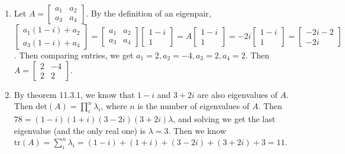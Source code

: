 \documentclass[10pt,english]{article}
\begin{document}
\begin{enumerate}
\item Let $A=\begin{bmatrix}a_1&a_2\\a_3&a_4\end{bmatrix}$. By the definition of an eigenpair, $\begin{bmatrix}a_1(1-i)+a_2\\a_3(1-i)+a_4\end{bmatrix}=\begin{bmatrix}a_1&a_2\\a_3&a_4\end{bmatrix}\begin{bmatrix}1-i\\1\end{bmatrix}=A\begin{bmatrix}1-i\\1\end{bmatrix}=-2i\begin{bmatrix}1-i\\1\end{bmatrix}=\begin{bmatrix}-2i-2\\-2i\end{bmatrix}$. Then comparing entries, we get $a_1=2, a_2=-4, a_3=2, a_4=2$. Then $A=\begin{bmatrix}2&-4\\2&2\end{bmatrix}$.

\item By theorem 11.3.1, we know that $1-i$ and $3+2i$ are also eigenvalues of $A$. Then $\text{det}(A)=\prod_i^n\lambda_i$, where $n$ is the number of eigenvalues of $A$. Then $78=(1-i)(1+i)(3-2i)(3+2i)\lambda$, and solving we get the last eigenvalue (and the only real one) is $\lambda=3$. Then we know $\text{tr}(A)=\sum_{i}^n\lambda_i=(1-i)+(1+i)+(3-2i)+(3+2i)+3=11$. 
\end{enumerate}
\end{document}
